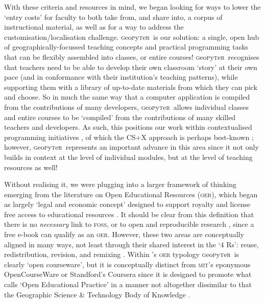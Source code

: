 \documentclass[letter, 11pt,titlepage]{article}
\newcommand{\gp}{\textsc{g}eo\textsc{p}y\textsc{t}e\textsc{r}~\/}
\newcommand{\eg}{e.g.~\/}
\begin{document}
With these criteria and resources in mind, we began looking for ways to lower the `entry costs' for faculty to both take from, and share into, a corpus of instructional material, as well as for a way to address the customisation/localisation challenge. \gp is our solution: a single, open hub of geographically-focussed teaching concepts and practical programming tasks that can be flexibly assembled into classes, or entire courses! \gp recognises that teachers need to be able to develop their own classroom `story' at their own pace (and in conformance with their institution's teaching patterns), while supporting them with a library of up-to-date materials from which they can pick and choose. So in much the same way that a computer application is compiled from the contributions of many developers, \gp allows individual classes and entire courses to be `compiled' from the contributions of many skilled teachers and developers. As such, this positions our work within contextualised programming initiatives \citep{Guzdial2010,Lukkarinen2016}, of which the CS+X approach is perhaps best-known \citep[\eg][]{Mir2017}; however, \gp represents an important advance in this area since it not only builds in context at the level of individual modules, but at the level of teaching resources as well!

Without realising it, we were plugging into a larger framework of thinking emerging from the literature on Open Educational Resources (\textsc{oer}), which began as largely `legal and economic concept' designed to support royalty and license free access to educational resources \citep{butcher2010open}. It should be clear from this definition that there is no \emph{necessary} link to \textsc{foss}, or to open and reproducible research \citep{Brunsdon:2020aa}, since a free e-book can qualify as an \textsc{oer}. However, these two areas are conceptually aligned in many ways, not least through their shared interest in the `4 Rs': reuse, redistribution, revision, and remixing \citep{Hilton2010}. Within \citeauthor{du2017}'s \citeyearpar{du2017} \textsc{oer} typology \gp is clearly `open courseware', but it is conceptually distinct from \textsc{mit}'s eponymous OpenCourseWare or Standford's Coursera since it is designed to promote what \citeauthor{Ehlers2011} calls `Open Educational Practice' \citeyearpar{Ehlers2011} in a manner not altogether dissimilar to that the Geographic Science \& Technology Body of Knowledge \citep{bok2018}.
\end{document}
